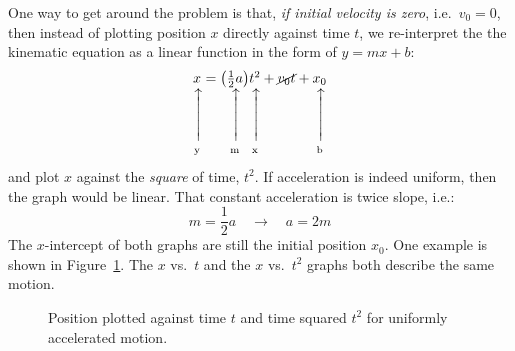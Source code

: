 \documentclass[11pt]{article}
\makeatletter
\newcommand\vertarrowbox[2]{%
    \begin{array}[t]{@{}c@{}} #1 \\
    \rotatebox{90}{$\xrightarrow{\hphantom{abcdefgh}}$} \\[-1ex]
    \mathclap{\scriptstyle\text{#2}}%
    \end{array}}
\makeatother
\begin{document}
One way to get around the problem is that, \emph{if initial velocity is zero},
i.e.\ $v_0=0$, then instead of plotting position $x$ directly against time $t$,
we re-interpret the the kinematic equation as a linear function in the form
of $y=mx+b$:
\begin{equation}
  \vertarrowbox{x}{y}=\vertarrowbox{\left(\frac12 a\right)}{m}
  \vertarrowbox{t^2}{x}+
  \cancel{v_0t}+
  \vertarrowbox{x_0}{b}
\end{equation}
and plot $x$ against the \emph{square} of time, $t^2$. If acceleration is
indeed uniform, then the graph would be linear. That constant acceleration is
twice slope, i.e.:
\begin{equation*}
  m=\frac12 a\quad\rightarrow\quad a=2m
\end{equation*}
The $x$-intercept of both graphs are still the initial position $x_0$. One
example is shown in Figure~\ref{switch1}. The $x$ vs.\ $t$ and the $x$ vs.\
$t^2$ graphs both describe the same motion.
\begin{figure}[!ht]
  \centering
  \hspace{.15in}
  \caption{Position plotted against time $t$ and time squared $t^2$ for
    uniformly accelerated motion.}
  \label{switch1}
\end{figure} 
\end{document}
